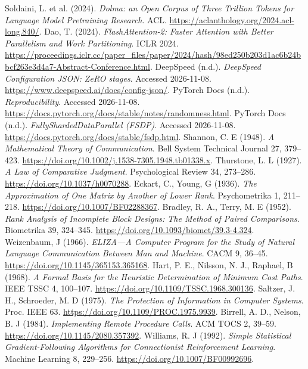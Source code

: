  Soldaini, L. et al. (2024). \emph{Dolma: an Open Corpus of Three Trillion Tokens for Language Model Pretraining Research}. ACL. \url{https://aclanthology.org/2024.acl-long.840/}.
 Dao, T. (2024). \emph{FlashAttention-2: Faster Attention with Better Parallelism and Work Partitioning}. ICLR 2024. \url{https://proceedings.iclr.cc/paper_files/paper/2024/hash/98ed250b203d1ac6b24bbcf263e3d4a7-Abstract-Conference.html}.
 DeepSpeed (n.d.). \emph{DeepSpeed Configuration JSON: ZeRO stages}. Accessed 2026-11-08. \url{https://www.deepspeed.ai/docs/config-json/}.
 PyTorch Docs (n.d.). \emph{Reproducibility}. Accessed 2026-11-08. \url{https://docs.pytorch.org/docs/stable/notes/randomness.html}.
 PyTorch Docs (n.d.). \emph{FullyShardedDataParallel (FSDP)}. Accessed 2026-11-08. \url{https://docs.pytorch.org/docs/stable/fsdp.html}.
 Shannon, C. E (1948). \emph{A Mathematical Theory of Communication}. Bell System Technical Journal 27, 379--423. \url{https://doi.org/10.1002/j.1538-7305.1948.tb01338.x}.
 Thurstone, L. L (1927). \emph{A Law of Comparative Judgment}. Psychological Review 34, 273--286. \url{https://doi.org/10.1037/h0070288}.
 Eckart, C., Young, G (1936). \emph{The Approximation of One Matrix by Another of Lower Rank}. Psychometrika 1, 211--218. \url{https://doi.org/10.1007/BF02288367}.
 Bradley, R. A., Terry, M. E (1952). \emph{Rank Analysis of Incomplete Block Designs: The Method of Paired Comparisons}. Biometrika 39, 324--345. \url{https://doi.org/10.1093/biomet/39.3-4.324}.
 Weizenbaum, J (1966). \emph{ELIZA---A Computer Program for the Study of Natural Language Communication Between Man and Machine}. CACM 9, 36--45. \url{https://doi.org/10.1145/365153.365168}.
 Hart, P. E., Nilsson, N. J., Raphael, B (1968). \emph{A Formal Basis for the Heuristic Determination of Minimum Cost Paths}. IEEE TSSC 4, 100--107. \url{https://doi.org/10.1109/TSSC.1968.300136}.
 Saltzer, J. H., Schroeder, M. D (1975). \emph{The Protection of Information in Computer Systems}. Proc. IEEE 63. \url{https://doi.org/10.1109/PROC.1975.9939}.
 Birrell, A. D., Nelson, B. J (1984). \emph{Implementing Remote Procedure Calls}. ACM TOCS 2, 39--59. \url{https://doi.org/10.1145/2080.357392}.
 Williams, R. J (1992). \emph{Simple Statistical Gradient-Following Algorithms for Connectionist Reinforcement Learning}. Machine Learning 8, 229--256. \url{https://doi.org/10.1007/BF00992696}.
